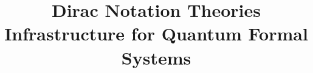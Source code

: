 \documentclass{book}
\title{\textbf{Dirac Notation Theories}\\ 
\Large{Infrastructure for Quantum Formal Systems}}
\author{}
\begin{document}
\newcommand*{\unit}{\texttt{unit}}
\newcommand*{\utt}{\texttt{tt}}
\newcommand*{\fst}{\texttt{fst}}
\newcommand*{\snd}{\texttt{snd}}
\newcommand*{\reduce}{\ \triangleright\ }
\newcommand*{\reducefrom}{\ \triangleleft\ }

\newcommand*{\zeroK}[1]{\mathbf{0}_{\mathcal{K}(#1)}}
\newcommand*{\zeroB}[1]{\mathbf{0}_{\mathcal{B}(#1)}}
\newcommand*{\zeroO}[1]{\mathbf{0}_{\mathcal{O}(#1)}}









% 
% 

% 

% 

% 

% 

% 

% 



\end{document}
